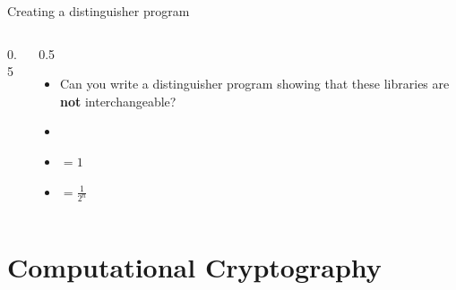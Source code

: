 \ifdefined\PRESENTATION\else\PassOptionsToClass{handout}{beamer}\fi\documentclass[aspectratio=169, lualatex]{beamer}
\begin{document}
\begin{frame}{Creating a distinguisher program}
	\begin{columns}[c]
		\begin{column}{0.5\textwidth}
			\begin{center}
			\end{center}
		\end{column}
		\begin{column}{0.5\textwidth}
			\begin{itemize}
				\item Can you write a distinguisher program showing that these libraries are \textbf{not} interchangeable?
				      \pause
				\item {}
				\item {} $= 1$
				\item {} $= \frac{1}{2^n}$
			\end{itemize}
		\end{column}
	\end{columns}
\end{frame}

\section{Computational Cryptography}
\end{document}
